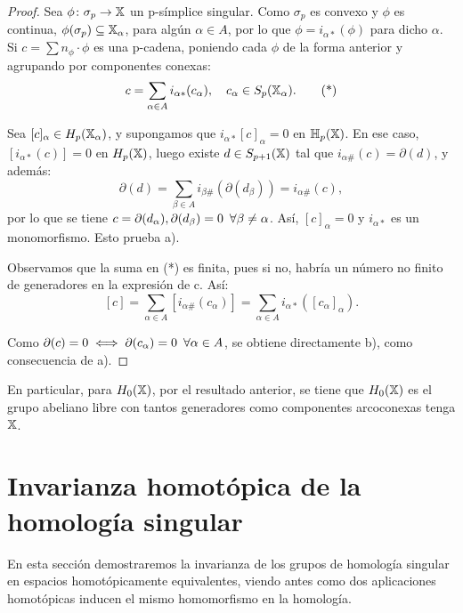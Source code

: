 \begin{proof}
  Sea $\phi \colon \sigma_p \to {\mathbb X}$ un p-símplice singular. Como $\sigma_p$ es convexo y $\phi$ es continua, $\phi(\sigma_p) \subseteq {\mathbb X}_\alpha$, para algún
  $\alpha \in A$, por lo que $\phi = i_{\alpha*}(\phi)$ para dicho $\alpha$. \\
  Si $c = \sum n_\phi \cdot \phi$ es una p-cadena, poniendo cada $\phi$ de la forma anterior y agrupando por componentes conexas:
  \begin{equation}
    c = \sum\limits_{\alpha \in A} i_{\alpha*}(c_\alpha), \quad c_\alpha \in S_p({\mathbb X}_\alpha).  \tag{*}
  \end{equation}

  Sea $[c]_\alpha \in H_p({\mathbb X}_\alpha)$, y supongamos que $i_{\alpha*}[c]_\alpha = 0$ en ${\mathbb H}_p({\mathbb X})$. En ese caso, $[i_{\alpha*}(c)] = 0$ en $H_p({\mathbb X})$,
  luego existe $d \in S_{p+1}({\mathbb X})$ tal que $i_{\alpha\#}(c) = \partial(d)$, y además:
  \[\partial(d) = \sum\limits_{\beta \in A} i_{\beta\#}(\partial(d_\beta)) = i_{\alpha\#}(c), \]
  por lo que se tiene $c = \partial(d_\alpha), \partial(d_\beta) = 0 \hspace{0.5em} \forall \beta \neq \alpha$. Así, $[c]_\alpha = 0$ y $i_{\alpha*}$ es un monomorfismo.
  Esto prueba a).

  Observamos que la suma en (*) es finita, pues si no, habría un número no finito de generadores en la expresión de c. Así:
  \[  [c] = \sum\limits_{\alpha \in A} [i_{\alpha\#}(c_\alpha)] =  \sum\limits_{\alpha \in A} i_{\alpha*}([c_\alpha]_\alpha).\]

  Como $\partial(c) = 0 \iff \partial(c_\alpha) = 0 \hspace{0.5em} \forall \alpha \in A$, se obtiene directamente b), como consecuencia de a).
\end{proof}

En particular, para $H_0({\mathbb X})$, por el resultado anterior, se tiene que $H_0({\mathbb X})$ es el grupo abeliano libre con tantos generadores como
componentes arcoconexas tenga ${\mathbb X}$.

\section{Invarianza homotópica de la homología singular}

En esta sección demostraremos la invarianza de los grupos de homología singular en espacios homotópicamente equivalentes, viendo antes como
dos aplicaciones homotópicas inducen el mismo homomorfismo en la homología.

